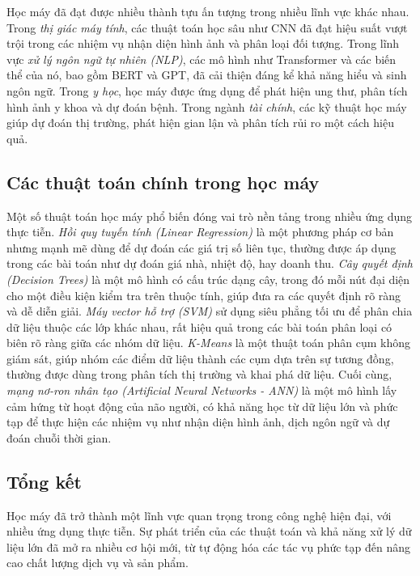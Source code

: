 \documentclass[12pt]{report}
\begin{document}
Học máy đã đạt được nhiều thành tựu ấn tượng trong nhiều lĩnh vực khác nhau. Trong \textit{thị giác máy tính}, các thuật toán học sâu như CNN đã đạt hiệu suất vượt trội trong các nhiệm vụ nhận diện hình ảnh và phân loại đối tượng. Trong lĩnh vực \textit{xử lý ngôn ngữ tự nhiên (NLP)}, các mô hình như Transformer và các biến thể của nó, bao gồm BERT và GPT, đã cải thiện đáng kể khả năng hiểu và sinh ngôn ngữ. Trong \textit{y học}, học máy được ứng dụng để phát hiện ung thư, phân tích hình ảnh y khoa và dự đoán bệnh. Trong ngành \textit{tài chính}, các kỹ thuật học máy giúp dự đoán thị trường, phát hiện gian lận và phân tích rủi ro một cách hiệu quả.


\subsection{Các thuật toán chính trong học máy}

Một số thuật toán học máy phổ biến đóng vai trò nền tảng trong nhiều ứng dụng thực tiễn. \textit{Hồi quy tuyến tính (Linear Regression)} là một phương pháp cơ bản nhưng mạnh mẽ dùng để dự đoán các giá trị số liên tục, thường được áp dụng trong các bài toán như dự đoán giá nhà, nhiệt độ, hay doanh thu. \textit{Cây quyết định (Decision Trees)} là một mô hình có cấu trúc dạng cây, trong đó mỗi nút đại diện cho một điều kiện kiểm tra trên thuộc tính, giúp đưa ra các quyết định rõ ràng và dễ diễn giải. \textit{Máy vector hỗ trợ (SVM)} sử dụng siêu phẳng tối ưu để phân chia dữ liệu thuộc các lớp khác nhau, rất hiệu quả trong các bài toán phân loại có biên rõ ràng giữa các nhóm dữ liệu. \textit{K-Means} là một thuật toán phân cụm không giám sát, giúp nhóm các điểm dữ liệu thành các cụm dựa trên sự tương đồng, thường được dùng trong phân tích thị trường và khai phá dữ liệu. Cuối cùng, \textit{mạng nơ-ron nhân tạo (Artificial Neural Networks - ANN)} là một mô hình lấy cảm hứng từ hoạt động của não người, có khả năng học từ dữ liệu lớn và phức tạp để thực hiện các nhiệm vụ như nhận diện hình ảnh, dịch ngôn ngữ và dự đoán chuỗi thời gian.


\subsection{Tổng kết}

Học máy đã trở thành một lĩnh vực quan trọng trong công nghệ hiện đại, với nhiều ứng dụng thực tiễn. Sự phát triển của các thuật toán và khả năng xử lý dữ liệu lớn đã mở ra nhiều cơ hội mới, từ tự động hóa các tác vụ phức tạp đến nâng cao chất lượng dịch vụ và sản phẩm.
\end{document}
